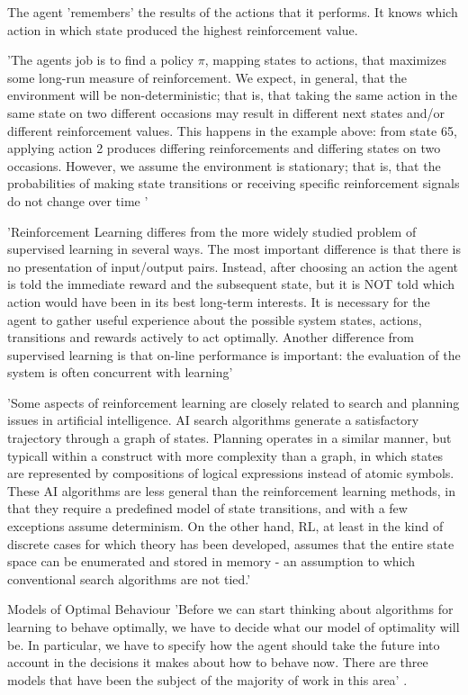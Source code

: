 The agent 'remembers' the results of the actions that it performs. It knows which action in which state produced the highest reinforcement value.

'The agents job is to find a policy $\pi$, mapping states to actions, that maximizes some long-run measure of reinforcement. We expect, in general, that the environment will be non-deterministic; that is, that taking the same action in the same state on two different occasions may result in different next states and/or different reinforcement values. This happens in the example above: from state 65, applying action 2 produces differing reinforcements and differing states on two occasions. However, we assume the environment is stationary; that is, that the probabilities of making state transitions or receiving specific reinforcement signals do not change over time ' \cite{KaelblingLittmanMoore1996}

'Reinforcement Learning differes from the more widely studied problem of supervised learning in several ways. The most important difference is that there is no presentation of input/output pairs. Instead, after choosing an action the agent is told the immediate reward and the subsequent state, but it is NOT told which action would have been in its best long-term interests. It is necessary for the agent to gather useful experience about the possible system states, actions, transitions and rewards actively to act optimally. Another difference from supervised learning is that on-line performance is important: the evaluation of the system is often concurrent with learning' \cite{KaelblingLittmanMoore1996}

'Some aspects of reinforcement learning are closely related to search and planning issues in artificial intelligence. AI search algorithms generate a satisfactory trajectory through a graph of states. Planning operates in a similar manner, but typicall within a construct with more complexity than a graph, in which states are represented by compositions of logical expressions instead of atomic symbols. These AI algorithms are less general than the reinforcement learning methods, in that they require a predefined model of state transitions, and with a few exceptions assume determinism. On the other hand, RL, at least in the kind of discrete cases for which theory has been developed, assumes that the entire state space can be enumerated and stored in memory - an assumption to which conventional search algorithms are not tied.' \cite{KaelblingLittmanMoore1996}

Models of Optimal Behaviour
'Before we can start thinking about algorithms for learning to behave optimally, we have to decide what our model of optimality will be. In particular, we have to specify how the agent should take the future into account in the decisions it makes about how to behave now. There are three models that have been the subject of the majority of work in this area' \cite{KaelblingLittmanMoore1996}.





